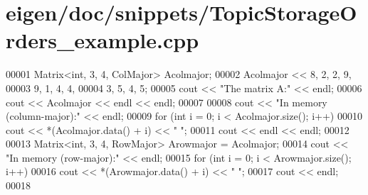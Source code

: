 \hypertarget{eigen_2doc_2snippets_2_topic_storage_orders__example_8cpp_source}{}\section{eigen/doc/snippets/\+Topic\+Storage\+Orders\+\_\+example.cpp}
\label{eigen_2doc_2snippets_2_topic_storage_orders__example_8cpp_source}

\begin{DoxyCode}
00001 Matrix<int, 3, 4, ColMajor> Acolmajor;
00002 Acolmajor << 8, 2, 2, 9,
00003              9, 1, 4, 4,
00004          3, 5, 4, 5;
00005 cout << \textcolor{stringliteral}{"The matrix A:"} << endl;
00006 cout << Acolmajor << endl << endl; 
00007 
00008 cout << \textcolor{stringliteral}{"In memory (column-major):"} << endl;
00009 \textcolor{keywordflow}{for} (\textcolor{keywordtype}{int} i = 0; i < Acolmajor.size(); i++)
00010   cout << *(Acolmajor.data() + i) << \textcolor{stringliteral}{"  "};
00011 cout << endl << endl;
00012 
00013 Matrix<int, 3, 4, RowMajor> Arowmajor = Acolmajor;
00014 cout << \textcolor{stringliteral}{"In memory (row-major):"} << endl;
00015 \textcolor{keywordflow}{for} (\textcolor{keywordtype}{int} i = 0; i < Arowmajor.size(); i++)
00016   cout << *(Arowmajor.data() + i) << \textcolor{stringliteral}{"  "};
00017 cout << endl;
00018 
\end{DoxyCode}
